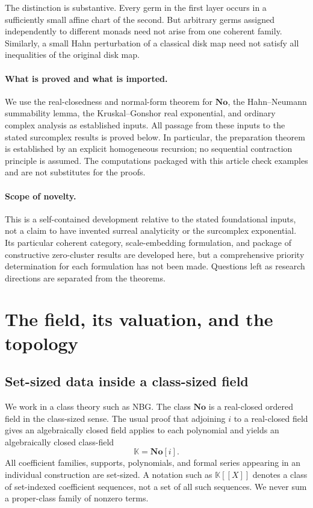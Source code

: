 \documentclass[11pt,letterpaper]{article}
\numberwithin{equation}{section}
\theoremstyle{definition}
\theoremstyle{remark}
\newcommand{\No}{\mathbf{No}}
\newcommand{\K}{\mathbb K}
\begin{document}
The distinction is substantive. Every germ in the first layer occurs in a
sufficiently small affine chart of the second. But arbitrary germs assigned
independently to different monads need not arise from one coherent family.
Similarly, a small Hahn perturbation of a classical disk map need not satisfy
all inequalities of the original disk map.

\paragraph{What is proved and what is imported.}
We use the real-closedness and normal-form theorem for $\No$, the
Hahn--Neumann summability lemma, the Kruskal--Gonshor real exponential, and
ordinary complex analysis \cite{Ahlfors} as established inputs. All passage from these
inputs to the stated surcomplex results is proved below. In particular, the
preparation theorem is established by an explicit homogeneous recursion;
no sequential contraction principle is assumed. The computations packaged
with this article check examples and are not substitutes for the proofs.

\paragraph{Scope of novelty.}
This is a self-contained development relative to the stated foundational
inputs, not a claim to have invented surreal analyticity or the surcomplex
exponential. Its particular coherent category, scale-embedding formulation,
and package of constructive zero-cluster results are developed here, but a
comprehensive priority determination for each formulation has not been made.
Questions left as research directions are separated from the theorems.

\section{The field, its valuation, and the topology}
\label{sec:foundations}

\subsection{Set-sized data inside a class-sized field}

We work in a class theory such as NBG. The class $\No$ is a real-closed
ordered field in the class-sized sense. The usual proof that adjoining $i$
to a real-closed field gives an algebraically closed field applies to each
polynomial and yields an algebraically closed class-field
\[
 \K=\No[i].
\]
All coefficient families, supports, polynomials, and formal series appearing
in an individual construction are set-sized. A notation such as $\K[[X]]$
denotes a class of set-indexed coefficient sequences, not a set of all such
sequences. We never sum a proper-class family of nonzero terms.
\end{document}
